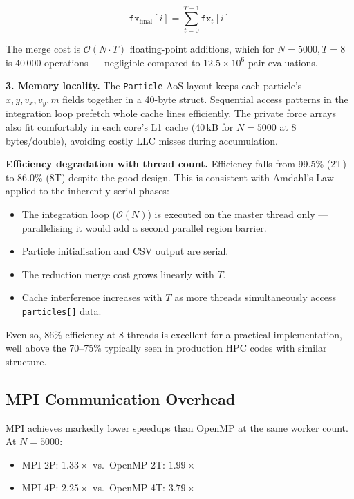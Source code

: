﻿\documentclass[12pt,a4paper]{article}
\begin{document}
\begin{equation}
    \texttt{fx}_{\text{final}}[i]
    = \sum_{t=0}^{T-1} \texttt{fx}_t[i]
\end{equation}

The merge cost is $\mathcal{O}(N \cdot T)$ floating-point additions, which
for $N=5000, T=8$ is 40\,000 operations --- negligible compared to
$12.5 \times 10^6$ pair evaluations.

\textbf{3. Memory locality.}
The \texttt{Particle} AoS layout keeps each particle's $x, y, v_x, v_y, m$
fields together in a 40-byte struct. Sequential access patterns in the
integration loop prefetch whole cache lines efficiently. The private force
arrays also fit comfortably in each core's L1 cache (40\,kB for $N=5000$
at 8 bytes/double), avoiding costly LLC misses during accumulation.

\textbf{Efficiency degradation with thread count.}
Efficiency falls from 99.5\% (2T) to 86.0\% (8T) despite the good design.
This is consistent with Amdahl's Law applied to the inherently serial
phases:
\begin{itemize}
    \item The integration loop ($\mathcal{O}(N)$) is executed on the master
          thread only --- parallelising it would add a second parallel region
          barrier.
    \item Particle initialisation and CSV output are serial.
    \item The reduction merge cost grows linearly with $T$.
    \item Cache interference increases with $T$ as more threads
          simultaneously access \texttt{particles[]} data.
\end{itemize}

Even so, 86\% efficiency at 8 threads is excellent for a practical
implementation, well above the 70--75\% typically seen in production HPC
codes with similar structure.

\subsection{MPI Communication Overhead}

MPI achieves markedly lower speedups than OpenMP at the same worker count.
At $N=5000$:
\begin{itemize}
    \item MPI 2P: $1.33\times$ vs.\ OpenMP 2T: $1.99\times$
    \item MPI 4P: $2.25\times$ vs.\ OpenMP 4T: $3.79\times$
\end{itemize}
\end{document}
